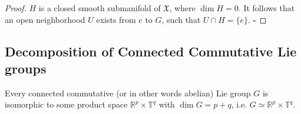 \documentclass[envcountsect,runningheads]{llncs}
\renewcommand{\qed}{\hfill$\square$}
\begin{document}
\begin{proof}
$H$ is a closed smooth submanifold of $\mathfrak{X}$, where $\dim H = 0$. It follows that an open neighborhood $U$ exists from $e$ to $G$, such that $U \cap H = \{e\}$. \qed
\end{proof}

\subsection{Decomposition of Connected Commutative Lie groups}
\label{decomposition}
\begin{theorem}{\cite[p.~116,~p.~26]{onishchik1993lie,van2003lie}}
\label{connectedcommutativeliegroupdecomposition}
Every connected commutative (or in other words abelian) Lie group $G$ is isomorphic to some product space $\mathbb{R}^p \times \mathbb{T}^q$ with $\dim G = p+q$, i.e. $G \simeq \mathbb{R}^p \times \mathbb{T}^q$.
\end{theorem}
\end{document}
